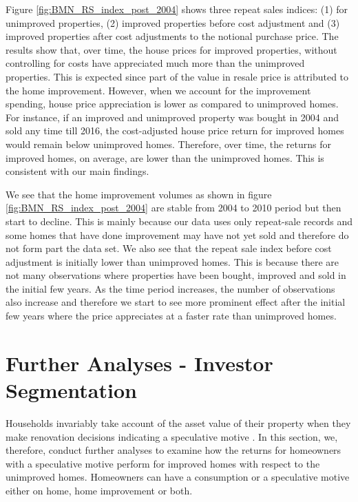 \documentclass[AEJ,reqno, draftmode]{AEA} %
\begin{document}
%
Figure \ref{fig:BMN_RS_index_post_2004} shows three repeat sales indices: (1) for unimproved properties, (2) improved properties before cost adjustment and (3) improved properties after cost adjustments to the notional purchase price. The results show that, over time, the house prices for improved properties, without controlling for costs have appreciated much more than the unimproved properties. This is expected since part of the value in resale price is attributed to the home improvement. However, when we account for the improvement spending, house price appreciation is lower as compared to unimproved homes. For instance, if an improved and unimproved property was bought in 2004 and sold any time till 2016, the cost-adjusted house price return for improved homes would remain below unimproved homes. Therefore, over time, the returns for improved homes, on average, are lower than the unimproved homes. This is consistent with our main findings. 

We see that the home improvement volumes as shown in figure \ref{fig:BMN_RS_index_post_2004} are stable from 2004 to 2010 period but then start to decline. This is mainly because our data uses only repeat-sale records and some homes that have done improvement may have not yet sold and therefore do not form part the data set. We also see that the repeat sale index before cost adjustment is initially lower than unimproved homes. This is because there are not many observations where properties have been bought, improved and sold in the initial few years. As the time period increases, the number of observations also increase and therefore we start to see more prominent effect after the initial few years where the price appreciates at a faster rate than unimproved homes.


\section{Further Analyses - Investor Segmentation}

Households invariably take account of the asset value of their property when they make renovation decisions indicating a speculative motive \citep{helms2003understanding}. In this section, we, therefore, conduct further analyses to examine how the returns for homeowners with a speculative motive perform for improved homes with respect to the unimproved homes. Homeowners can have a consumption or a speculative motive either on home, home improvement or both. 
\end{document}
